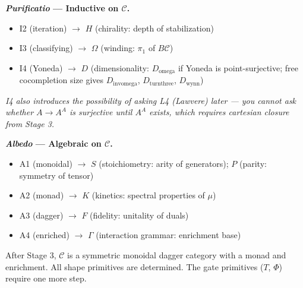 \documentclass[12pt,a4paper]{article}
\begin{document}
\medskip

\noindent\textbf{\emph{Purificatio} --- Inductive on $\mathcal{C}$.}
\begin{itemize}[nosep, leftmargin=2em]
\item I2 (iteration) $\to$ $H$ (chirality: depth of stabilization)
\item I3 (classifying) $\to$ $\Omega$ (winding: $\pi_1$ of $B\mathcal{C}$)
\item I4 (Yoneda) $\to$ $D$ (dimensionality: $D_{\text{omega}}$ if Yoneda is point-surjective; free cocompletion size gives $D_{\text{invomega}}$, $D_{\text{turnthree}}$, $D_{\text{wynn}}$)
\end{itemize}
{\small\itshape I4 also introduces the possibility of asking L4 (Lawvere) later --- you cannot ask whether $A \to A^A$ is surjective until $A^A$ exists, which requires cartesian closure from Stage 3.}

\medskip

\noindent\textbf{\emph{Albedo} --- Algebraic on $\mathcal{C}$.}
\begin{itemize}[nosep, leftmargin=2em]
\item A1 (monoidal) $\to$ $S$ (stoichiometry: arity of generators); $P$ (parity: symmetry of tensor)
\item A2 (monad) $\to$ $K$ (kinetics: spectral properties of $\mu$)
\item A3 (dagger) $\to$ $F$ (fidelity: unitality of duals)
\item A4 (enriched) $\to$ $\Gamma$ (interaction grammar: enrichment base)
\end{itemize}
After Stage 3, $\mathcal{C}$ is a symmetric monoidal dagger category with a monad and enrichment. All shape primitives are determined. The gate primitives ($T$, $\Phi$) require one more step.

\medskip
\end{document}
